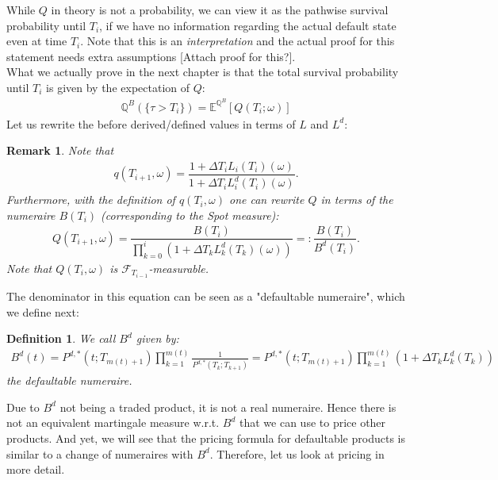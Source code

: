 \documentclass[12pt]{article}
\newtheorem{remark}[theorem]{Remark}
\newtheorem{definition}[theorem]{Definition}
\begin{document}
	While $Q$ in theory is not a probability, we can view it as the pathwise survival probability until $T_i$, if we have no information regarding the actual default state even at time $T_i$. Note that this is an \emph{interpretation} and the actual proof for this statement needs extra assumptions \color{red}[Attach proof for this?]\color{black}.\\
	What we actually prove in the next chapter is that the total survival probability until $T_i$ is given by the expectation of $Q$:
	\begin{align*}
		\mathbb{Q}^B\left(\{\tau > T_i\}\right) = \mathbb{E}^{\mathbb{Q}^B} \left[Q(T_i;\omega)\right]
	\end{align*}
	Let us rewrite the before derived/defined values in terms of $L$ and $L^d$:
	\begin{remark}
		Note that 
		\begin{align*}
			q(T_{i+1}, \omega) = \dfrac{1 + \Delta  T_i L_i(T_i)(\omega)}{1 + \Delta  T_i L^d_i(T_i)(\omega)}.
		\end{align*}
		Furthermore, with the definition of $q(T_i, \omega)$ one can rewrite $Q$ in terms of the numeraire $B(T_i)$ (corresponding to the Spot measure):
		\begin{align*}
			Q\left( T_{i+1}, \omega \right) = \dfrac{B(T_i)}{\prod_{k=0}^{i}(1 + \Delta T_k L^d_k(T_k)(\omega))} =: \dfrac{B(T_i)}{B^d(T_i)}.
		\end{align*}
		Note that $Q(T_i, \omega)$ is $\mathcal{F}_{T_{i-1}}$-measurable.
	\end{remark}
	The denominator in this equation can be seen as a "defaultable numeraire", which we define next:
	\begin{definition}
		We call $B^d$ given by:
		\begin{align*}
			B^d(t) = P^{d,*}(t;T_{m(t)+1}) \prod_{k=1}^{m(t)}\frac{1}{P^{d,*}(T_k;T_{k+1})} = P^{d,*}(t;T_{m(t)+1}) \prod_{k=1}^{m(t)}(1+\Delta T_k L^d_k(T_k))
		\end{align*}
		the \emph{defaultable numeraire}. 
	\end{definition}
	Due to $B^d$ not being a traded product, it is not a real numeraire. Hence there is not an equivalent martingale measure w.r.t. $B^d$ that we can use to price other products. And yet, we will see that the pricing formula for defaultable products is similar to a change of numeraires with $B^d$. Therefore, let us look at pricing in more detail.
	
	
	
	
\end{document}
